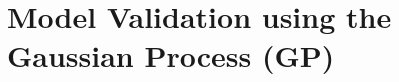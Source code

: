 \documentclass[a4paper, 10pt]{article}
\numberwithin{equation}{section}
\begin{document}
\section{Model Validation using the Gaussian Process (GP)}
\label{sec:GP_WholeSection}

\end{document}
